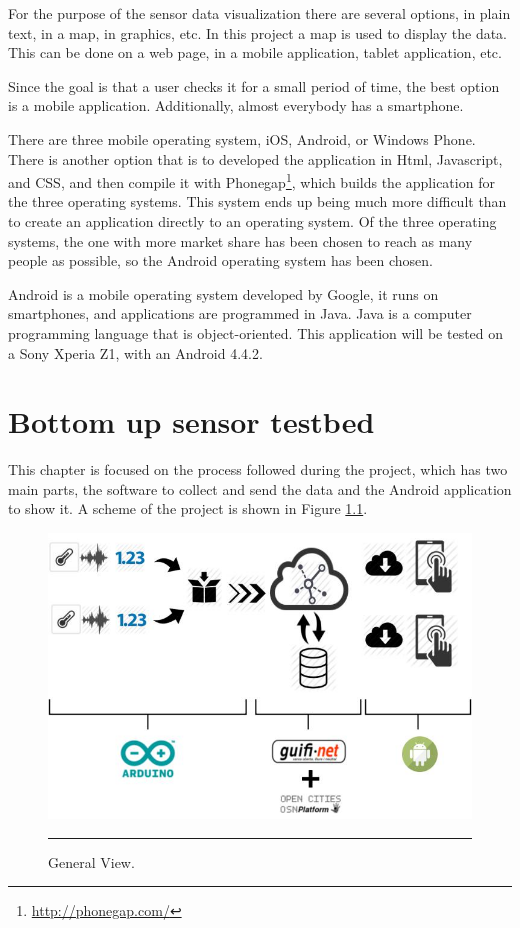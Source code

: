 \documentclass[12pt, a4paper,twoside]{tesi_upf}
\begin{document}
    For the purpose of the sensor data visualization there are several options, in plain text, in a map, in graphics, etc. In this project a map is used to display the data. This can be done on a web page, in a mobile application, tablet application, etc.
    
    Since the goal is that a user checks it for a small period of time, the best option is a mobile application. Additionally, almost everybody has a smartphone.
    
    There are three mobile operating system, iOS, Android, or Windows Phone. There is another option that is to developed the application in Html, Javascript, and CSS, and then compile it with Phonegap\footnote{\url{http://phonegap.com/}}, which builds the application for the three operating systems. This system ends up being much more difficult than to create an application directly to an operating system.
    Of the three operating systems, the one with more market share has been chosen to reach as many people as possible, so the Android operating system has been chosen.
      
    Android is a mobile operating system developed by Google, it runs on smartphones, and applications are programmed in Java. Java is a computer programming language that is object-oriented.    
    This application will be tested on a Sony Xperia Z1, with an Android 4.4.2.

\chapter{Bottom up sensor testbed}
\label{Chapter4}

  This chapter is focused on the process followed during the project, which has two main parts, the software to collect and send the data and the Android application to show it. A scheme of the project is shown in Figure \ref{fig:reportGeneralView}.
  
  \begin{figure}[htbp]
    \centering
        \includegraphics[scale=0.5]{./Figures/reportGeneralView.jpg}
        \rule{25em}{0.5pt}
    \caption[General View]{General View.}
    \label{fig:reportGeneralView}
  \end{figure}
  
\end{document}
